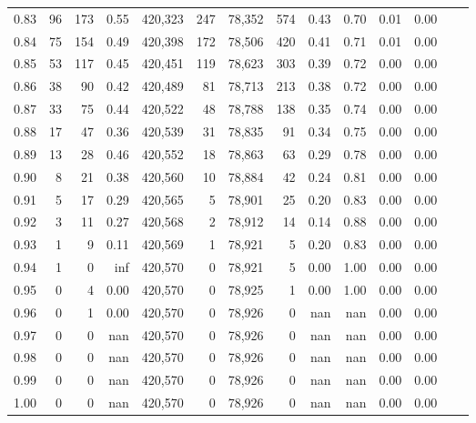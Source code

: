 \begin{tabular}{rrrrrrrrrrrrrr}
0.83 &      96 &    173 &    0.55 &  420,323 &      247 &  78,352 &     574 &  0.43 &  0.70 &  0.01 &      0.00 \\
0.84 &      75 &    154 &    0.49 &  420,398 &      172 &  78,506 &     420 &  0.41 &  0.71 &  0.01 &      0.00 \\
0.85 &      53 &    117 &    0.45 &  420,451 &      119 &  78,623 &     303 &  0.39 &  0.72 &  0.00 &      0.00 \\
0.86 &      38 &     90 &    0.42 &  420,489 &       81 &  78,713 &     213 &  0.38 &  0.72 &  0.00 &      0.00 \\
0.87 &      33 &     75 &    0.44 &  420,522 &       48 &  78,788 &     138 &  0.35 &  0.74 &  0.00 &      0.00 \\
0.88 &      17 &     47 &    0.36 &  420,539 &       31 &  78,835 &      91 &  0.34 &  0.75 &  0.00 &      0.00 \\
0.89 &      13 &     28 &    0.46 &  420,552 &       18 &  78,863 &      63 &  0.29 &  0.78 &  0.00 &      0.00 \\
0.90 &       8 &     21 &    0.38 &  420,560 &       10 &  78,884 &      42 &  0.24 &  0.81 &  0.00 &      0.00 \\
0.91 &       5 &     17 &    0.29 &  420,565 &        5 &  78,901 &      25 &  0.20 &  0.83 &  0.00 &      0.00 \\
0.92 &       3 &     11 &    0.27 &  420,568 &        2 &  78,912 &      14 &  0.14 &  0.88 &  0.00 &      0.00 \\
0.93 &       1 &      9 &    0.11 &  420,569 &        1 &  78,921 &       5 &  0.20 &  0.83 &  0.00 &      0.00 \\
0.94 &       1 &      0 &     inf &  420,570 &        0 &  78,921 &       5 &  0.00 &  1.00 &  0.00 &      0.00 \\
0.95 &       0 &      4 &    0.00 &  420,570 &        0 &  78,925 &       1 &  0.00 &  1.00 &  0.00 &      0.00 \\
0.96 &       0 &      1 &    0.00 &  420,570 &        0 &  78,926 &       0 &   nan &   nan &  0.00 &      0.00 \\
0.97 &       0 &      0 &     nan &  420,570 &        0 &  78,926 &       0 &   nan &   nan &  0.00 &      0.00 \\
0.98 &       0 &      0 &     nan &  420,570 &        0 &  78,926 &       0 &   nan &   nan &  0.00 &      0.00 \\
0.99 &       0 &      0 &     nan &  420,570 &        0 &  78,926 &       0 &   nan &   nan &  0.00 &      0.00 \\
1.00 &       0 &      0 &     nan &  420,570 &        0 &  78,926 &       0 &   nan &   nan &  0.00 &      0.00 \\
\bottomrule
\end{tabular}
